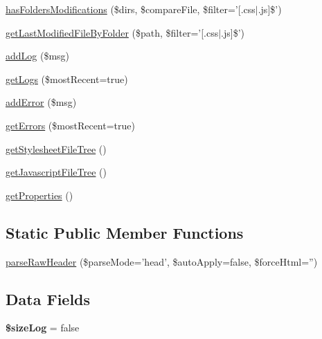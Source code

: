 \begin{DoxyCompactItemize}
\item 
\hyperlink{class_js_css_chunker_a7f9d5a7305a6eacc06d6efe724193186}{hasFoldersModifications} (\$dirs, \$compareFile, \$filter='\mbox{[}.css$|$.js\mbox{]}\$')
\item 
\hyperlink{class_js_css_chunker_aee9eb602587067c3712307deb8873dc0}{getLastModifiedFileByFolder} (\$path, \$filter='\mbox{[}.css$|$.js\mbox{]}\$')
\item 
\hyperlink{class_js_css_chunker_aa38326093bdc56769bae1e7b5bc6ae27}{addLog} (\$msg)
\item 
\hyperlink{class_js_css_chunker_ac9b0d6884469e0666b9a9c4981f7318e}{getLogs} (\$mostRecent=true)
\item 
\hyperlink{class_js_css_chunker_af6642f557316ed7df113bdf77aae3446}{addError} (\$msg)
\item 
\hyperlink{class_js_css_chunker_ab380fa3025bb07475ad8b72a58afe916}{getErrors} (\$mostRecent=true)
\item 
\hyperlink{class_js_css_chunker_a24af374e9c031780e6d9706026be5051}{getStylesheetFileTree} ()
\item 
\hyperlink{class_js_css_chunker_a61406be3290066d74f435f617cd4897b}{getJavascriptFileTree} ()
\item 
\hyperlink{class_js_css_chunker_ad92c14b6c86304d3f1fb86b2936d3408}{getProperties} ()
\end{DoxyCompactItemize}
\subsection*{Static Public Member Functions}
\begin{DoxyCompactItemize}
\item 
\hyperlink{class_js_css_chunker_ac32c20b2f951ab2438e316fe389e75f7}{parseRawHeader} (\$parseMode='head', \$autoApply=false, \$forceHtml='')
\end{DoxyCompactItemize}
\subsection*{Data Fields}
\begin{DoxyCompactItemize}
\item 
\hypertarget{class_js_css_chunker_a0b79a23bdabea1ec46ecb0842f0962f2}{
{\bfseries \$sizeLog} = false}
\label{class_js_css_chunker_a0b79a23bdabea1ec46ecb0842f0962f2}

\end{DoxyCompactItemize}

